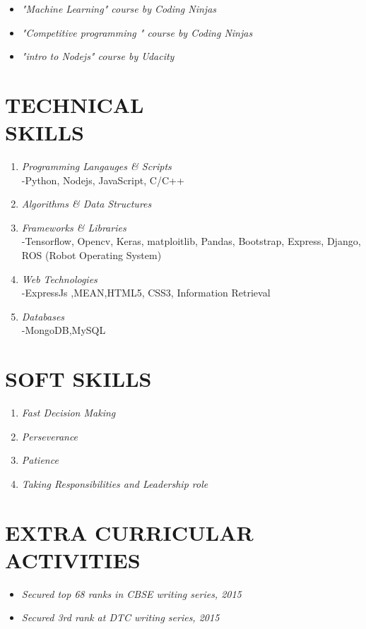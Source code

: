 \documentclass[margin]{res}
\begin{document}
\begin{enumerate}
\begin{itemize}
 \item{\sl  "Machine Learning" course by Coding Ninjas }
 \item{\sl  "Competitive programming " course by Coding Ninjas}
 \item{\sl  "intro to Nodejs" course by Udacity}
 \end{itemize}

\section{TECHNICAL  \\ SKILLS} \begin{enumerate}
\item {\sl Programming Langauges \& Scripts }\\
	-Python, Nodejs, JavaScript, C/C++
\item {\sl Algorithms \& Data Structures }\\
\item {\sl Frameworks \& Libraries}\\
	-Tensorflow, Opencv, Keras, matploitlib, Pandas, Bootstrap, Express, Django, ROS (Robot Operating System)
\item {\sl Web Technologies}\\
	-ExpressJs ,MEAN,HTML5, CSS3, Information Retrieval 
\item{\sl Databases}\\
	-MongoDB,MySQL
\end{enumerate}



\section{SOFT SKILLS }\begin{enumerate}
\item{\sl Fast Decision Making }
\item{\sl Perseverance}
\item{\sl Patience}
\item{\sl Taking Responsibilities and Leadership role}
\end{enumerate}

\section{EXTRA CURRICULAR ACTIVITIES}\begin{itemize}
\item{\sl Secured top 68 ranks in CBSE writing series, 2015}
\item{\sl Secured 3rd rank at DTC writing series, 2015}


\end{itemize}
\end{enumerate}
\end{document}
